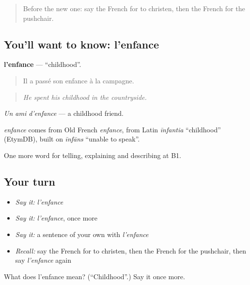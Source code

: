 \label{lesson:FR-C309-enfance}



\begin{quote}
Before the new one: say the French for to christen, then the French for the pushchair.
\end{quote}

\subsection*{You'll want to know: l'enfance}
\textbf{l'enfance} — \textquotedblleft{}childhood\textquotedblright{}.

\begin{quote}
Il a passé son enfance à la campagne.
\end{quote}

\begin{quote}
\emph{He spent his childhood in the countryside.}
\end{quote}

\emph{Un ami d'enfance} — a childhood friend.

\begin{cousinweb}
\emph{enfance} comes from Old French \emph{enfance}, from Latin \emph{īnfantia} \textquotedblleft{}childhood\textquotedblright{} (EtymDB), built on \emph{īnfāns} \textquotedblleft{}unable to speak\textquotedblright{}.
\end{cousinweb}

\begin{grammarlens}[title={What you've built}]
One more word for telling, explaining and describing at B1.
\end{grammarlens}

\subsection*{Your turn}
\begin{itemize}
\raggedright
  \item \emph{Say it:} \emph{l'enfance}
  \item \emph{Say it:} \emph{l'enfance}, once more
  \item \emph{Say it:} a sentence of your own with \emph{l'enfance}
  \item \emph{Recall:} say the French for to christen, then the French for the pushchair, then say \emph{l'enfance} again
\end{itemize}

\begin{tcolorbox}[breakable,colback=teal!4,colframe=teal!35!black,title={Before you move on}]
What does l'enfance mean? (\textquotedblleft{}Childhood\textquotedblright{}.) Say it once more.
\end{tcolorbox}
